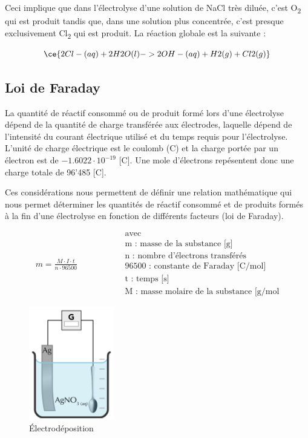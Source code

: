 \documentclass[
  11pt,
  french,
  a4paper,
  openany]{book}
\begin{document}
Ceci implique que dans l'électrolyse d'une solution de NaCl très diluée, c'est O\textsubscript{2} qui est produit tandis que, dans une solution plus concentrée, c'est presque exclusivement Cl\textsubscript{2} qui est produit. La réaction globale est la suivante :

\[
\ce{2 Cl-(aq) + 2 H2O(l) -> 2 OH-(aq) + H2(g) + Cl2(g)}
\]

\clearpage

\hypertarget{loi-de-faraday}{%
\subsection{Loi de Faraday}\label{loi-de-faraday}}

La quantité de réactif consommé ou de produit formé lors d'une électrolyse dépend de la quantité de charge transférée aux électrodes, laquelle dépend de l'intensité du courant électrique utilisé et du temps requis pour l'électrolyse. L'unité de charge électrique est le coulomb (C) et la charge portée par un électron est de \(-1.6022 \cdot 10^{-19}\) {[}C{]}. Une mole d'électrons repésentent donc une charge totale de 96'485 {[}C{]}.

Ces considérations nous permettent de définir une relation mathématique qui nous permet déterminer les quantités de réactif consommé et de produits formés à la fin d'une électrolyse en fonction de différents facteurs (loi de Faraday).

\[
\begin{split}
m = \frac{M \cdot I \cdot t}{n \cdot 96500}
\end{split}
\qquad\qquad
\begin{split}
&\text{avec} \\
&\text{m : masse de la substance [g]} \\
&\text{n : nombre d'électrons transférés} \\
&\text{96500 : constante de Faraday [C/mol]} \\
&\text{t : temps [s]} \\
&\text{M : masse molaire de la substance [g/mol}
\end{split}
\]

\clearpage

\begin{figure}
\centering
\includegraphics[width=10em,height=\textheight]{images/electrolysis-spoon.png}
\caption{Électrodéposition}
\end{figure}
\end{document}
